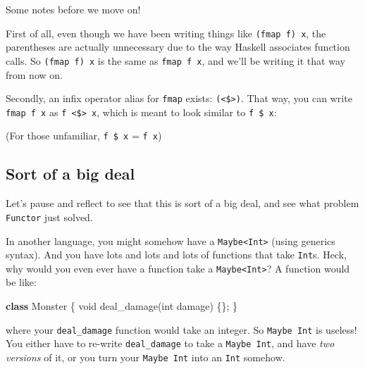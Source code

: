 \documentclass[]{article}
\newenvironment{Shaded}{}{}
\newcommand{\KeywordTok}[1]{\textcolor[rgb]{0.00,0.44,0.13}{\textbf{{#1}}}}
\newcommand{\DataTypeTok}[1]{\textcolor[rgb]{0.56,0.13,0.00}{{#1}}}
\newcommand{\DecValTok}[1]{\textcolor[rgb]{0.25,0.63,0.44}{{#1}}}
\newcommand{\FunctionTok}[1]{\textcolor[rgb]{0.02,0.16,0.49}{{#1}}}
\newcommand{\NormalTok}[1]{{#1}}
\begin{document}
Some notes before we move on!

First of all, even though we have been writing things like
\texttt{(fmap\ f)\ x}, the parentheses are actually unnecessary due to
the way Haskell associates function calls. So \texttt{(fmap\ f)\ x} is
the same as \texttt{fmap\ f\ x}, and we'll be writing it that way from
now on.

Secondly, an infix operator alias for \texttt{fmap} exists:
\texttt{(\textless{}\$\textgreater{})}. That way, you can write
\texttt{fmap\ f\ x} as \texttt{f\ \textless{}\$\textgreater{}\ x}, which
is meant to look similar to \texttt{f\ \$\ x}:

\begin{Shaded}
\end{Shaded}

(For those unfamiliar, \texttt{f\ \$\ x} = \texttt{f\ x})

\subsection{Sort of a big deal}\label{sort-of-a-big-deal}

Let's pause and reflect to see that this is sort of a big deal, and see
what problem \texttt{Functor} just solved.

In another language, you might somehow have a
\texttt{Maybe\textless{}Int\textgreater{}} (using generics syntax). And
you have lots and lots and lots of functions that take \texttt{Int}s.
Heck, why would you even ever have a function take a
\texttt{Maybe\textless{}Int\textgreater{}}? A function would be like:

\begin{Shaded}
\begin{Highlighting}[]
\KeywordTok{class} \NormalTok{Monster \{}
    \DataTypeTok{void} \FunctionTok{deal_damage}\NormalTok{(}\DataTypeTok{int} \NormalTok{damage) \{\};}
\NormalTok{\}}
\end{Highlighting}
\end{Shaded}

where your \texttt{deal\_damage} function would take an integer. So
\texttt{Maybe\ Int} is useless! You either have to re-write
\texttt{deal\_damage} to take a \texttt{Maybe\ Int}, and have \emph{two
versions} of it, or you turn your \texttt{Maybe\ Int} into an
\texttt{Int} somehow.
\end{document}
